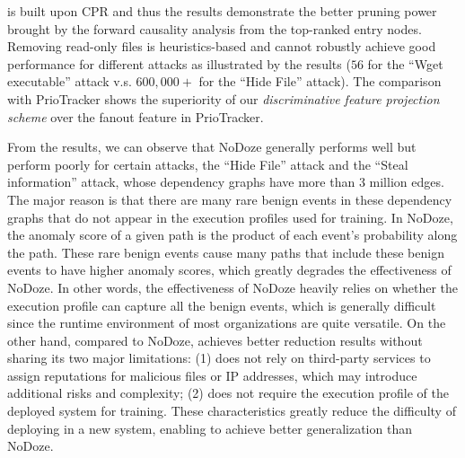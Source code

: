 \tool is built upon CPR and thus the results demonstrate the better pruning power brought by the forward causality analysis from the top-ranked entry nodes.
Removing read-only files is heuristics-based and cannot robustly achieve good performance for different attacks as illustrated by the results (\eg $56$ for the ``Wget executable'' attack v.s. $600,000+$ for the ``Hide File'' attack).
The comparison with PrioTracker shows the superiority of our \textit{discriminative feature projection scheme} over the fanout feature in PrioTracker.

From the results, we can observe that NoDoze generally performs well but perform poorly for certain attacks, \eg the ``Hide File'' attack and the ``Steal information'' attack, whose dependency graphs have more than 3 million edges. 
The major reason is that there are many rare benign events in these dependency graphs that do not appear in the execution profiles used for training.
In NoDoze, the anomaly score of a given path is the product of each event's probability along the path. 
These rare benign events cause many paths that include these benign events to have higher anomaly scores, which greatly degrades the effectiveness of NoDoze.
In other words, the effectiveness of NoDoze heavily relies on whether the execution profile can capture all the benign events, which is generally difficult since the runtime environment of most organizations are quite versatile.
%
On the other hand, compared to NoDoze, \tool achieves better reduction results without sharing its two major limitations:
(1) \tool does not rely on third-party services to assign reputations for malicious files or IP addresses, which may introduce additional risks and complexity;
(2) \tool does not require the execution profile of the deployed system for training. 
These characteristics greatly reduce the difficulty of deploying \tool in a new system, enabling \tool to achieve better generalization than NoDoze.


